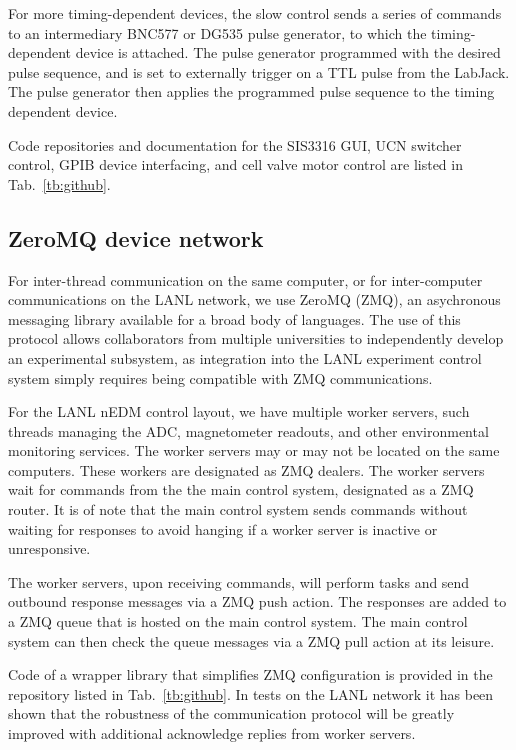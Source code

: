 For more timing-dependent devices, the slow control sends a series of commands to an intermediary BNC577 or DG535 pulse generator, to which the timing-dependent device is attached. The pulse generator programmed with the desired pulse sequence, and is set to externally trigger on a TTL pulse from the LabJack. The pulse generator then applies the programmed pulse sequence to the timing dependent device.

Code repositories and documentation for the SIS3316 GUI, UCN switcher control, GPIB device interfacing, and cell valve motor control are listed in Tab.~\ref{tb:github}.


\subsection{ZeroMQ device network}


For inter-thread communication on the same computer, or for inter-computer communications on the LANL network, we use ZeroMQ (ZMQ), an asychronous messaging library available for a broad body of languages. The use of this protocol allows collaborators from multiple universities to independently develop an experimental subsystem, as integration into the LANL experiment control system simply requires being compatible with ZMQ communications.

For the LANL nEDM control layout, we have multiple worker servers, such threads managing the ADC, magnetometer readouts, and other environmental monitoring services. The worker servers may or may not be located on the same computers. These workers are designated as ZMQ dealers. The worker servers wait for commands from the the main control system, designated as a ZMQ router. It is of note that the main control system sends commands without waiting for responses to avoid hanging if a worker server is inactive or unresponsive.

The worker servers, upon receiving commands, will perform tasks and send outbound response messages via a ZMQ push action. The responses are added to a ZMQ queue that is hosted on the main control system. The main control system can then check the queue messages via a ZMQ pull action at its leisure.

Code of a wrapper library that simplifies ZMQ configuration is provided in the repository listed in Tab.~\ref{tb:github}. In tests on the LANL network it has been shown that the robustness of the communication protocol will be greatly improved with additional acknowledge replies from worker servers.

